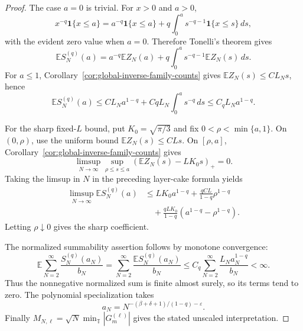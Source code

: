 \documentclass[11pt]{amsart}
\numberwithin{equation}{section}
\theoremstyle{definition}
\theoremstyle{remark}
\newcommand{\T}{\mathbb T}
\newcommand{\Exp}{\mathbb E}
\newcommand{\eps}{\varepsilon}
\begin{document}
\begin{proof}
The case \(a=0\) is trivial.  For \(x>0\) and \(a>0\),
\[
  x^{-q}\mathbf1\{x\le a\}
  =
  a^{-q}\mathbf1\{x\le a\}
  +q\int_0^a s^{-q-1}\mathbf1\{x\le s\}\,ds,
\]
with the evident zero value when \(a=0\).  Therefore Tonelli's theorem gives
\[
  \Exp S_N^{(q)}(a)
  =
  a^{-q}\Exp Z_N(a)
  +q\int_0^a s^{-q-1}\Exp Z_N(s)\,ds .
\]
For \(a\le1\), Corollary~\ref{cor:global-inverse-family-counts} gives
\(\Exp Z_N(s)\le CL_Ns\), hence
\[
  \Exp S_N^{(q)}(a)
  \le
  CL_Na^{1-q}+CqL_N\int_0^a s^{-q}\,ds
  \le C_qL_Na^{1-q}.
\]

For the sharp fixed-\(L\) bound, put \(K_0=\sqrt{\pi/3}\) and fix
\(0<\rho<\min\{a,1\}\).  On \((0,\rho)\), use the uniform bound
\(\Exp Z_N(s)\le CLs\).  On \([\rho,a]\), Corollary~\ref{cor:global-inverse-family-counts}
gives
\[
  \limsup_{N\to\infty}
  \sup_{\rho\le s\le a}
  \left(\Exp Z_N(s)-LK_0s\right)_+
  =0 .
\]
Taking the limsup in \(N\) in the preceding layer-cake formula yields
\[
\begin{aligned}
  \limsup_{N\to\infty}\Exp S_N^{(q)}(a)
  &\le
  LK_0a^{1-q}
  +\frac{qCL}{1-q}\rho^{1-q}  \\
  &\quad
  +\frac{qLK_0}{1-q}\left(a^{1-q}-\rho^{1-q}\right).
\end{aligned}
\]
Letting \(\rho\downarrow0\) gives the sharp coefficient.

The normalized summability assertion follows by monotone convergence:
\[
  \Exp\sum_{N=2}^\infty \frac{S_N^{(q)}(a_N)}{b_N}
  =
  \sum_{N=2}^\infty \frac{\Exp S_N^{(q)}(a_N)}{b_N}
  \le
  C_q\sum_{N=2}^\infty \frac{L_Na_N^{1-q}}{b_N}
  <\infty .
\]
Thus the nonnegative normalized sum is finite almost surely, so its terms tend
to zero.  The polynomial specialization takes
\[
  a_N=N^{-(\beta+\delta+1)/(1-q)-\eps}.
\]
Finally \(M_{N,\ell}=\sqrt N\min_{\T}|G_m^{(\ell)}|\) gives the stated unscaled
interpretation.
\end{proof}
\end{document}
